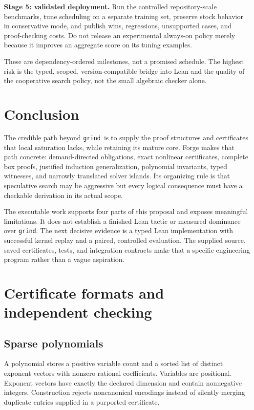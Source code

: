 \documentclass[11pt,a4paper]{article}
\newcommand{\grind}{\texttt{grind}}
\begin{document}
\textbf{Stage 5: validated deployment.} Run the controlled repository-scale
benchmarks, tune scheduling on a separate training set, preserve stock behavior
in conservative mode, and publish wins, regressions, unsupported cases, and
proof-checking costs. Do not release an experimental always-on policy merely
because it improves an aggregate score on its tuning examples.

These are dependency-ordered milestones, not a promised schedule. The highest
risk is the typed, scoped, version-compatible bridge into Lean and the quality
of the cooperative search policy, not the small algebraic checker alone.

\section{Conclusion}

The credible path beyond \grind\ is to supply the proof structures and
certificates that local saturation lacks, while retaining its mature core.
Forge makes that path concrete: demand-directed obligations, exact nonlinear
certificates, complete box proofs, justified induction generalization,
polynomial invariants, typed witnesses, and narrowly translated solver islands.
Its organizing rule is that speculative search may be aggressive but every
logical consequence must have a checkable derivation in its actual scope.

The executable work supports four parts of this proposal and exposes meaningful
limitations. It does not establish a finished Lean tactic or measured dominance
over \grind. The next decisive evidence is a typed Lean implementation with
successful kernel replay and a paired, controlled evaluation. The supplied
source, saved certificates, tests, and integration contracts make that a
specific engineering program rather than a vague aspiration.


\appendix
\section{Certificate formats and independent checking}

\subsection{Sparse polynomials}

A polynomial stores a positive variable count and a sorted list of distinct
exponent vectors with nonzero rational coefficients. Variables are positional.
Exponent vectors have exactly the declared dimension and contain nonnegative
integers. Construction rejects noncanonical encodings instead of silently
merging duplicate entries supplied in a purported certificate.
\end{document}
